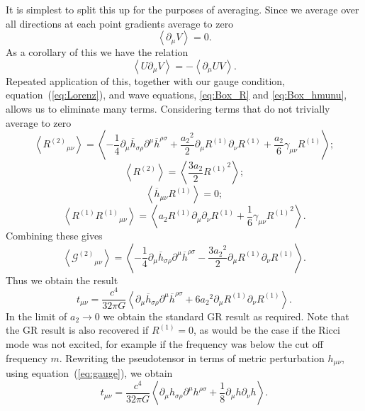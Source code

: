 \documentclass[a4paper, 11pt, titlepage, twoside]{report}
\newcommand{\eqnref}[1]{equation~(\ref{eq:#1})}
\newcommand{\recip}[1]{\ensuremath{\frac{1}{#1}}}
\begin{document}
It is simplest to split this up for the purposes of averaging. Since we average over all directions at each point gradients average to zero
\begin{equation}
\left\langle\partial_\mu V\right\rangle = 0.
\end{equation}
As a corollary of this we have the relation
\begin{equation}
\left\langle U\partial_\mu V\right\rangle = -\left\langle \partial_\mu U V\right\rangle.
\end{equation}
Repeated application of this, together with our gauge condition, \eqnref{Lorenz}, and wave equations, \eqref{eq:Box_R} and \eqref{eq:Box_hmunu}, allows us to eliminate many terms. Considering terms that do not trivially average to zero
\begin{equation}
\left\langle {R^{(2)}}_{\mu\nu} \right\rangle = \left\langle -\recip{4} \partial_\mu\overline{h}_{\sigma\rho}\partial^\mu\overline{h}^{\rho\sigma} + \frac{{a_2}^2}{2}\partial_\mu R^{(1)}\partial_\nu R^{(1)} + \frac{a_2}{6}\gamma_{\mu\nu}R^{(1)} \right\rangle;
\end{equation}
\begin{equation}
\left\langle R^{(2)} \right\rangle = \left\langle \frac{3a_2}{2}{R^{(1)}}^2 \right\rangle;
\end{equation}
\begin{equation}
\left\langle \overline{h}_{\mu\nu}R^{(1)} \right\rangle = 0;
\end{equation}
\begin{equation}
\left\langle R^{(1)}{R^{(1)}}_{\mu\nu} \right\rangle = \left\langle a_2 R^{(1)} \partial_\mu\partial_\nu R^{(1)} + \recip{6}\gamma_{\mu\nu}{R^{(1)}}^2\right\rangle.
\end{equation}
Combining these gives
\begin{equation}
\left\langle {\mathcal{G}^{(2)}}_{\mu\nu}\right\rangle = \left\langle -\recip{4} \partial_\mu\overline{h}_{\sigma\rho}\partial^\mu\overline{h}^{\rho\sigma} - \frac{3{a_2}^2}{2}\partial_\mu R^{(1)}\partial_\nu R^{(1)} \right\rangle.
\end{equation}
Thus we obtain the result
\begin{equation}
t_{\mu\nu} = \frac{c^4}{32\pi G}\left\langle \partial_\mu\overline{h}_{\sigma\rho}\partial^\mu\overline{h}^{\rho\sigma} + 6{a_2}^2\partial_\mu R^{(1)}\partial_\nu R^{(1)} \right\rangle.
\end{equation}
In the limit of $a_2 \rightarrow 0$ we obtain the standard GR result as required. Note that the GR result is also recovered if $R^{(1)} = 0$, as would be the case if the Ricci mode was not excited, for example if the frequency was below the cut off frequency $m$. Rewriting the pseudotensor in terms of metric perturbation $h_{\mu\nu}$, using \eqnref{gauge}, we obtain
\begin{equation}
t_{\mu\nu} = \frac{c^4}{32\pi G}\left\langle \partial_\mu h_{\sigma\rho}\partial^\mu h^{\rho\sigma} + \recip{8}\partial_\mu h \partial_\nu h \right\rangle.
\end{equation}
\end{document}
